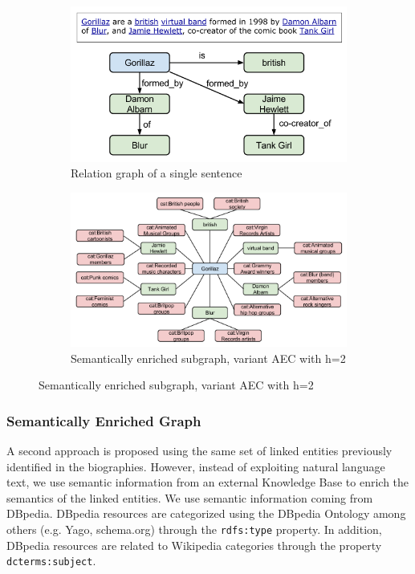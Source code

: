 \begin{figure}[ht!]
    \centering
    \begin{subfigure}{\textwidth}
        \centering
        \includegraphics[width=.7\linewidth]{ch06_similarity_pics/RelationGraph.png}
    	\caption{Relation graph of a single sentence}
        \label{fig:similarity:relation}
    \end{subfigure}
    \begin{subfigure}{\textwidth}
        \centering
        \includegraphics[width=.9\linewidth]{ch06_similarity_pics/EnrichedGraph2.png}
		\caption{Semantically enriched subgraph, variant AEC with h=2}
		\label{fig:similarity:enriched}
    \end{subfigure}
\end{figure}



\subsubsection{Semantically Enriched Graph}\label{sec:similarity:semantic_enriched_graph} %

A second approach is proposed using the same set of linked entities previously identified in the biographies. However, instead of exploiting natural language text, we use semantic information from an external Knowledge Base to enrich the semantics of the linked entities. We use semantic information coming from DBpedia. DBpedia resources are categorized using the DBpedia Ontology among others (e.g. Yago, schema.org) through the \texttt{rdfs:type} property. In addition, DBpedia resources are related to Wikipedia categories through the property \texttt{dcterms:subject}.

